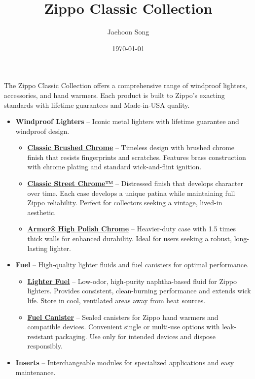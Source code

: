 \documentclass[11pt]{article}
\title{Zippo Classic Collection}
\author{Jaehoon Song}
\date{\today}
\begin{document}
\maketitle
The Zippo Classic Collection offers a comprehensive range of 
windproof lighters, accessories, and hand warmers. Each product 
is built to Zippo's exacting standards with lifetime guarantees 
and Made-in-USA quality.
\begin{itemize}
  \item \textbf{Windproof Lighters} -- Iconic metal lighters with 
  lifetime guarantee and windproof design.
    \begin{itemize}
      \item \href{https://zippo.com/products/classic-brushed-chrome}{\textbf{Classic Brushed Chrome}} -- Timeless 
      design with brushed chrome finish that resists fingerprints and scratches. Features brass construction 
      with chrome plating and standard wick-and-flint ignition. 
      \item \href{https://zippo.com/products/classic-street-chrome}{\textbf{Classic Street Chrome™}} -- Distressed 
      finish that develops character over time. Each case develops a unique patina while maintaining full Zippo 
      reliability. Perfect for collectors seeking a vintage, lived-in aesthetic.
      \item \href{https://zippo.com/products/armor-high-polish-chrome}{\textbf{Armor® High Polish Chrome}} -- Heavier-duty 
      case with 1.5 times thick walls for enhanced durability. 
      Ideal for users seeking a robust, long-lasting lighter.
    \end{itemize}
  \item \textbf{Fuel} -- High-quality lighter fluids and fuel canisters for optimal performance.
    \begin{itemize}
      \item \href{https://zippo.com/collections/lighter-fuel}{\textbf{Lighter Fuel}} -- Low-odor, high-purity 
      naphtha-based fluid for Zippo lighters. Provides consistent, clean-burning performance and extends wick 
      life. Store in cool, ventilated areas away from heat sources.
      \item \href{https://zippo.com/products/fuel-canister}{\textbf{Fuel Canister}} -- Sealed canisters for 
      Zippo hand warmers and compatible devices. Convenient single or multi-use options with leak-resistant 
      packaging. Use only for intended devices and dispose responsibly.
    \end{itemize}
  \item \textbf{Inserts} -- Interchangeable modules for specialized applications and easy maintenance.

\end{itemize}
\end{document}
